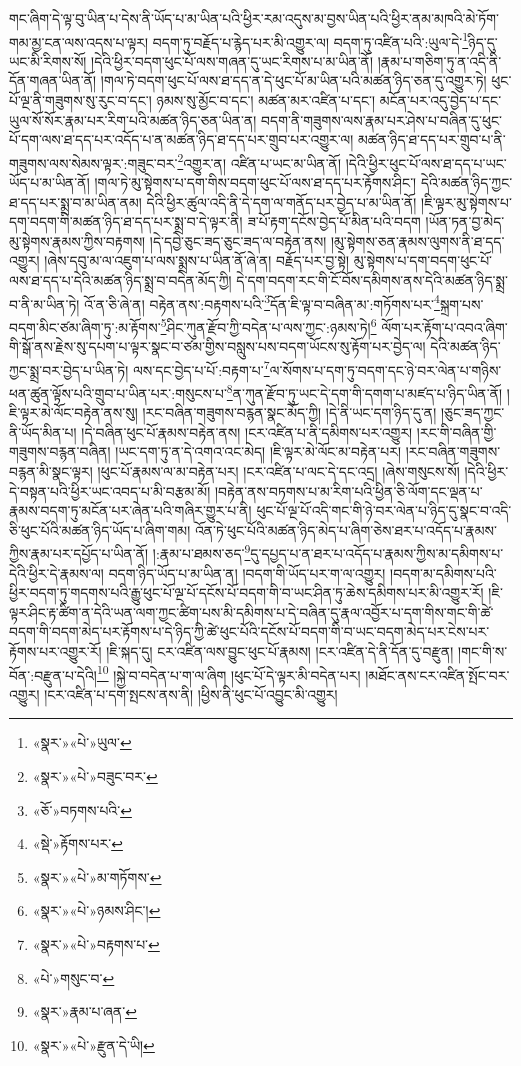 གང་ཞིག་དེ་ལྟ་བུ་ཡིན་པ་དེས་ནི་ཡོད་པ་མ་ཡིན་པའི་ཕྱིར་རམ་འདུས་མ་བྱས་ཡིན་པའི་ཕྱིར་ནམ་མཁའི་མེ་ཏོག་གམ་མྱ་ངན་ལས་འདས་པ་ལྟར། བདག་ཏུ་བརྗོད་པ་རྙེད་པར་མི་འགྱུར་ལ། བདག་ཏུ་འཛིན་པའི་:ཡུལ་དེ་\footnote{«སྣར་»«པེ་»ཡུལ་}ཉིད་དུ་ཡང་མི་རིགས་སོ། །དེའི་ཕྱིར་བདག་ཕུང་པོ་ལས་གཞན་དུ་ཡང་རིགས་པ་མ་ཡིན་ནོ། །རྣམ་པ་གཅིག་ཏུ་ན་འདི་ནི་དོན་གཞན་ཡིན་ནོ། །གལ་ཏེ་བདག་ཕུང་པོ་ལས་ཐ་དད་ན་དེ་ཕུང་པོ་མ་ཡིན་པའི་མཚན་ཉིད་ཅན་དུ་འགྱུར་ཏེ། ཕུང་པོ་ལྔ་ནི་གཟུགས་སུ་རུང་བ་དང་། ཉམས་སུ་མྱོང་བ་དང་། མཚན་མར་འཛིན་པ་དང་། མངོན་པར་འདུ་བྱེད་པ་དང་ཡུལ་སོ་སོར་རྣམ་པར་རིག་པའི་མཚན་ཉིད་ཅན་ཡིན་ན། བདག་ནི་གཟུགས་ལས་རྣམ་པར་ཤེས་པ་བཞིན་དུ་ཕུང་པོ་དག་ལས་ཐ་དད་པར་འདོད་པ་ན་མཚན་ཉིད་ཐ་དད་པར་གྲུབ་པར་འགྱུར་ལ། མཚན་ཉིད་ཐ་དད་པར་གྲུབ་པ་ནི་གཟུགས་ལས་སེམས་ལྟར་:གཟུང་བར་\footnote{«སྣར་»«པེ་»བཟུང་བར་}འགྱུར་ན། འཛིན་པ་ཡང་མ་ཡིན་ནོ། །དེའི་ཕྱིར་ཕུང་པོ་ལས་ཐ་དད་པ་ཡང་ཡོད་པ་མ་ཡིན་ནོ། །གལ་ཏེ་མུ་སྟེགས་པ་དག་གིས་བདག་ཕུང་པོ་ལས་ཐ་དད་པར་རྟོགས་ཤིང་། དེའི་མཚན་ཉིད་ཀྱང་ཐ་དད་པར་སྨྲ་བ་མ་ཡིན་ནམ། དེའི་ཕྱིར་ཚུལ་འདི་ནི་དེ་དག་ལ་གནོད་པར་བྱེད་པ་མ་ཡིན་ནོ། །ཇི་ལྟར་མུ་སྟེགས་པ་དག་བདག་གི་མཚན་ཉིད་ཐ་དད་པར་སྨྲ་བ་དེ་ལྟར་ནི། ཟ་པོ་རྟག་དངོས་བྱེད་པོ་མིན་པའི་བདག །ཡོན་ཏན་བྱ་མེད་མུ་སྟེགས་རྣམས་ཀྱིས་བརྟགས། །དེ་དབྱེ་ཅུང་ཟད་ཅུང་ཟད་ལ་བརྟེན་ནས། །མུ་སྟེགས་ཅན་རྣམས་ལུགས་ནི་ཐ་དད་འགྱུར། །ཞེས་དབུ་མ་ལ་འཇུག་པ་ལས་སྨྲས་པ་ཡིན་ནོ་ཞེ་ན། བརྗོད་པར་བྱ་སྟེ། མུ་སྟེགས་པ་དག་བདག་ཕུང་པོ་ལས་ཐ་དད་པ་དེའི་མཚན་ཉིད་སྨྲ་བ་བདེན་མོད་ཀྱི། དེ་དག་བདག་རང་གི་ངོ་བོས་དམིགས་ནས་དེའི་མཚན་ཉིད་སྨྲ་བ་ནི་མ་ཡིན་ཏེ། འོ་ན་ཅི་ཞེ་ན། བརྟེན་ནས་:བརྟགས་པའི་\footnote{«ཅོ་»བཏགས་པའི་}དོན་ཇི་ལྟ་བ་བཞིན་མ་:གཏོགས་པར་\footnote{«སྡེ་»རྟོགས་པར་}སྐྲག་པས་བདག་མིང་ཙམ་ཞིག་ཏུ་:མ་རྟོགས་\footnote{«སྣར་»«པེ་»མ་གཏོགས་}ཤིང་ཀུན་རྫོབ་ཀྱི་བདེན་པ་ལས་ཀྱང་:ཉམས་ཏེ།\footnote{«སྣར་»«པེ་»ཉམས་ཤིང་།} ལོག་པར་རྟོག་པ་འབའ་ཞིག་གི་སྒོ་ནས་རྗེས་སུ་དཔག་པ་ལྟར་སྣང་བ་ཙམ་གྱིས་བསླུས་པས་བདག་ཡོངས་སུ་རྟོག་པར་བྱེད་ལ། དེའི་མཚན་ཉིད་ཀྱང་སྨྲ་བར་བྱེད་པ་ཡིན་ཏེ། ལས་དང་བྱེད་པ་པོ་:བརྟག་པ་\footnote{«སྣར་»«པེ་»བརྟགས་པ་}ལ་སོགས་པ་དག་ཏུ་བདག་དང་ཉེ་བར་ལེན་པ་གཉིས་ཕན་ཚུན་ལྟོས་པའི་གྲུབ་པ་ཡིན་པར་:གསུངས་པ་\footnote{«པེ་»གསུང་བ་}ན་ཀུན་རྫོབ་ཏུ་ཡང་དེ་དག་གི་དགག་པ་མཛད་པ་ཉིད་ཡིན་ནོ། །ཇི་ལྟར་མེ་ལོང་བརྟེན་ནས་སུ། །རང་བཞིན་གཟུགས་བརྙན་སྣང་མོད་ཀྱི། །དེ་ནི་ཡང་དག་ཉིད་དུ་ན། །ཅུང་ཟད་ཀྱང་ནི་ཡོད་མིན་པ། །དེ་བཞིན་ཕུང་པོ་རྣམས་བརྟེན་ནས། །ངར་འཛིན་པ་ནི་དམིགས་པར་འགྱུར། །རང་གི་བཞིན་གྱི་གཟུགས་བརྙན་བཞིན། །ཡང་དག་ཏུ་ན་དེ་འགའ་འང་མེད། །ཇི་ལྟར་མེ་ལོང་མ་བརྟེན་པར། །རང་བཞིན་གཟུགས་བརྙན་མི་སྣང་ལྟར། །ཕུང་པོ་རྣམས་ལ་མ་བརྟེན་པར། །ངར་འཛིན་པ་ལང་དེ་དང་འདྲ། །ཞེས་གསུངས་སོ། །དེའི་ཕྱིར་དེ་བསྟན་པའི་ཕྱིར་ཡང་འབད་པ་མི་བརྩམ་མོ། །བརྟེན་ནས་བཏགས་པ་མ་རིག་པའི་ཕྱིན་ཅི་ལོག་དང་ལྡན་པ་རྣམས་བདག་ཏུ་མངོན་པར་ཞེན་པའི་གཞིར་གྱུར་པ་ནི། ཕུང་པོ་ལྔ་པོ་འདི་གང་གི་ཉེ་བར་ལེན་པ་ཉིད་དུ་སྣང་བ་འདི་ཅི་ཕུང་པོའི་མཚན་ཉིད་ཡོད་པ་ཞིག་གམ། འོན་ཏེ་ཕུང་པོའི་མཚན་ཉིད་མེད་པ་ཞིག་ཅེས་ཐར་པ་འདོད་པ་རྣམས་ཀྱིས་རྣམ་པར་དཔྱོད་པ་ཡིན་ནོ། །:རྣམ་པ་ཐམས་ཅད་\footnote{«སྣར་»རྣམ་པ་ཞན་}དུ་དཔྱད་པ་ན་ཐར་པ་འདོད་པ་རྣམས་ཀྱིས་མ་དམིགས་པ་དེའི་ཕྱིར་དེ་རྣམས་ལ། བདག་ཉིད་ཡོད་པ་མ་ཡིན་ན། །བདག་གི་ཡོད་པར་ག་ལ་འགྱུར། །བདག་མ་དམིགས་པའི་ཕྱིར་བདག་ཏུ་གདགས་པའི་རྒྱུ་ཕུང་པོ་ལྔ་པོ་དངོས་པོ་བདག་གི་བ་ཡང་ཤིན་ཏུ་ཆེས་དམིགས་པར་མི་འགྱུར་རོ། །ཇི་ལྟར་ཤིང་རྟ་ཚིག་ན་དེའི་ཡན་ལག་ཀྱང་ཚིག་པས་མི་དམིགས་པ་དེ་བཞིན་དུ་རྣལ་འབྱོར་པ་དག་གིས་གང་གི་ཚེ་བདག་གི་བདག་མེད་པར་རྟོགས་པ་དེ་ཉིད་ཀྱི་ཚེ་ཕུང་པོའི་དངོས་པོ་བདག་གི་བ་ཡང་བདག་མེད་པར་ངེས་པར་རྟོགས་པར་འགྱུར་རོ། །ཇི་སྐད་དུ། ངར་འཛིན་ལས་བྱུང་ཕུང་པོ་རྣམས། །ངར་འཛིན་དེ་ནི་དོན་དུ་བརྫུན། །གང་གི་ས་བོན་:བརྫུན་པ་དེའི།\footnote{«སྣར་»«པེ་»རྫུན་དེ་ཡི།} །སྐྱེ་བ་བདེན་པ་ག་ལ་ཞིག །ཕུང་པོ་དེ་ལྟར་མི་བདེན་པར། །མཐོང་ནས་ངར་འཛིན་སྤོང་བར་འགྱུར། །ངར་འཛིན་པ་དག་སྤངས་ནས་ནི། །ཕྱིས་ནི་ཕུང་པོ་འབྱུང་མི་འགྱུར། 